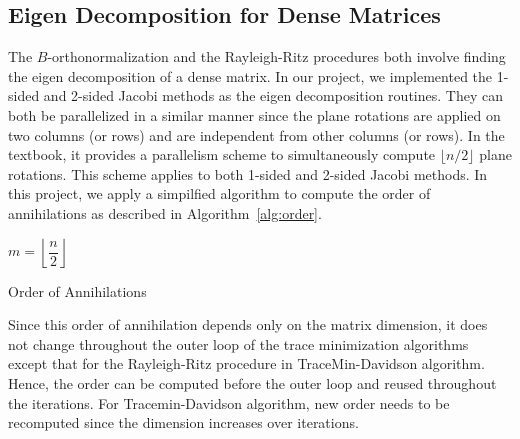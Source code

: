 \label{sec:implementation}
\subsection{Eigen Decomposition for Dense Matrices}
The $B$-orthonormalization and the Rayleigh-Ritz procedures both involve finding the eigen decomposition of a
dense matrix. In our project, we implemented the 1-sided and 2-sided Jacobi methods as the eigen decomposition
routines. They can both be parallelized in a similar manner since the plane rotations are applied on two columns
(or rows) and are independent from other columns (or rows). In the textbook\cite{gallopoulos}, it provides a
parallelism scheme to simultaneously compute $\lfloor n / 2\rfloor$ plane rotations. This scheme applies to both
1-sided and 2-sided Jacobi methods. In this project, we apply a simpilfied algorithm to compute the order of
annihilations as described in Algorithm~\ref{alg:order}.
\begin{algorithm}[!ht]
	\SetArgSty{}
	$m = \left\lfloor\dfrac{n}{2}\right\rfloor$\;
	\caption{Order of Annihilations}\label{alg:order}
\end{algorithm}
Since this order of annihilation depends only on the matrix dimension, it does not change throughout the outer
loop of the trace minimization algorithms except that for the Rayleigh-Ritz procedure in TraceMin-Davidson algorithm.
Hence, the order can be computed before the outer loop and reused throughout the iterations. For Tracemin-Davidson
algorithm, new order needs to be recomputed since the dimension increases over iterations.

